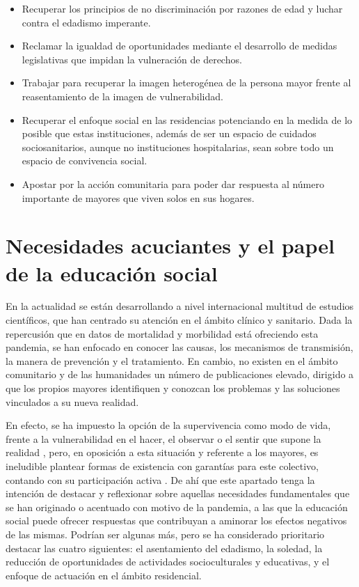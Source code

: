 \documentclass[spanish]{textolivre}
\begin{document}
\begin{itemize}
    \item Recuperar los principios de no discriminación por razones de edad y luchar contra el edadismo imperante.
    \item Reclamar la igualdad de oportunidades mediante el desarrollo de medidas legislativas que impidan la vulneración de derechos.
    \item Trabajar para recuperar la imagen heterogénea de la persona mayor frente al reasentamiento de la imagen de vulnerabilidad.
    \item Recuperar el enfoque social en las residencias potenciando en la medida de lo posible que estas instituciones, además de ser un espacio de cuidados sociosanitarios, aunque no instituciones hospitalarias, sean sobre todo un espacio de convivencia social.
    \item Apostar por la acción comunitaria para poder dar respuesta al número importante de mayores que viven solos en sus hogares.
\end{itemize}

\section{Necesidades acuciantes y el papel de la educación social}
En la actualidad se están desarrollando a nivel internacional multitud de estudios científicos, que han centrado su atención en el ámbito clínico y sanitario. Dada la repercusión que en datos de mortalidad y morbilidad está ofreciendo esta pandemia, se han enfocado en conocer las causas, los mecanismos de transmisión, la manera de prevención y el tratamiento. En cambio, no existen en el ámbito comunitario y de las humanidades un número de publicaciones elevado, dirigido a que los propios mayores identifiquen y conozcan los problemas y las soluciones vinculados a su nueva realidad.

En efecto, se ha impuesto la opción de la supervivencia como modo de vida, frente a la vulnerabilidad en el hacer, el observar o el sentir que supone la realidad \cite{marcos2020}, %
pero, en oposición a esta situación y referente a los mayores, es ineludible plantear formas de existencia con garantías para este colectivo, contando con su participación activa \cite{limon2018}. %
De ahí que este apartado tenga la intención de destacar y reflexionar sobre aquellas necesidades fundamentales que se han originado o acentuado con motivo de la pandemia, a las que la educación social puede ofrecer respuestas que contribuyan a aminorar los efectos negativos de las mismas. Podrían ser algunas más, pero se ha considerado prioritario destacar las cuatro siguientes: el asentamiento del edadismo, la soledad, la reducción de oportunidades de actividades socioculturales y educativas, y el enfoque de actuación en el ámbito residencial.
\end{document}
